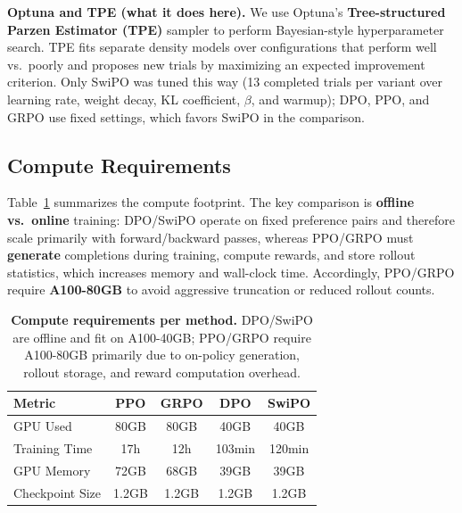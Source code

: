 \vspace{-0.4em}
\noindent\textbf{Optuna and TPE (what it does here).}
We use Optuna's \textbf{Tree-structured Parzen Estimator (TPE)} sampler to perform Bayesian-style hyperparameter search.
TPE fits separate density models over configurations that perform well vs.\ poorly and proposes new trials by maximizing an expected improvement criterion.
Only SwiPO was tuned this way (13 completed trials per variant over learning rate, weight decay, KL coefficient, $\beta$, and warmup); DPO, PPO, and GRPO use fixed settings, which favors SwiPO in the comparison.

\subsection{Compute Requirements}

\vspace{-0.25em}
\noindent
Table~\ref{tab:compute} summarizes the compute footprint.
The key comparison is \textbf{offline vs.\ online} training:
\textsc{DPO}/SwiPO operate on fixed preference pairs and therefore scale primarily with forward/backward passes,
whereas \textsc{PPO}/\textsc{GRPO} must \textbf{generate} completions during training, compute rewards, and store rollout statistics, which increases memory and wall-clock time.
Accordingly, \textsc{PPO}/\textsc{GRPO} require \textbf{A100-80GB} to avoid aggressive truncation or reduced rollout counts.

\begin{table}[ht!]
\centering
\normalsize
\renewcommand{\arraystretch}{1.8}
\begin{tabular}{@{}lcccc@{}}
\toprule
\textbf{Metric} & \textbf{PPO} & \textbf{GRPO} & \textbf{DPO} & \textbf{SwiPO} \\
\midrule
GPU Used & 80GB & 80GB & 40GB & 40GB \\ \hline
Training Time & 17h & 12h & 103min & 120min \\ \hline
GPU Memory & 72GB & 68GB & 39GB & 39GB \\ \hline
Checkpoint Size & 1.2GB & 1.2GB & 1.2GB & 1.2GB \\
\bottomrule
\end{tabular}
\caption{\textbf{Compute requirements per method.} \textsc{DPO}/SwiPO are offline and fit on A100-40GB; \textsc{PPO}/\textsc{GRPO} require A100-80GB primarily due to on-policy generation, rollout storage, and reward computation overhead.}
\label{tab:compute}
\end{table}

